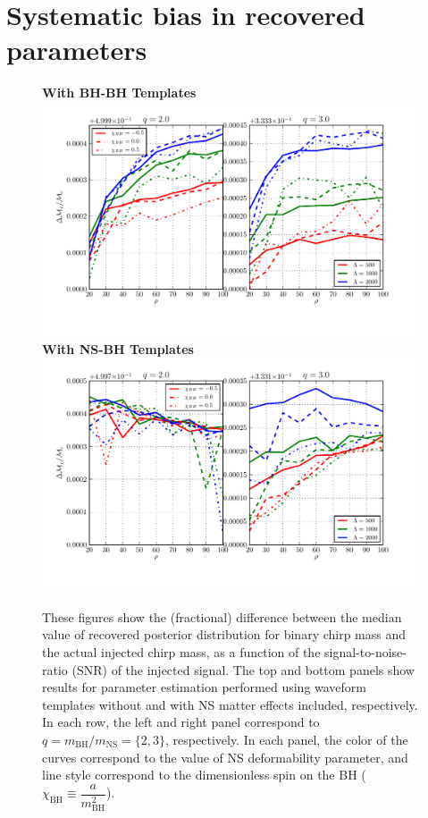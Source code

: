 \documentclass[aps,prd,amsmath,floats,floatfix, twocolumn,
superscriptaddress,nofootinbib,showpacs]{revtex4-1}
\begin{document}
\section{Systematic bias in recovered parameters}
\begin{figure}[h]
\centering 
\textbf{With BH-BH Templates}
\includegraphics[width=2\columnwidth]{plots/TN_chirpMassBias_vs_SNR_q23.pdf}\\ 
\textbf{With NS-BH Templates}
\includegraphics[width=2\columnwidth]{plots/TT_chirpMassBias_vs_SNR_q23.pdf}%
\caption{These figures show the (fractional) difference between the median value of
recovered posterior distribution for binary chirp mass and the actual injected chirp mass,
as a function of the signal-to-noise-ratio (SNR) of the injected signal.
The top and bottom panels show results for parameter estimation performed using
waveform templates without and with NS matter effects included, respectively.
In each row, the left and right panel correspond to 
$q=m_\mathrm{BH}/m_\mathrm{NS}=\{2,3\}$, respectively. 
In each panel, the color of the curves correspond to the value of NS deformability 
parameter, and line style correspond to the dimensionless spin on the BH 
($\chi_\mathrm{BH}\equiv \dfrac{a}{m_\mathrm{BH}^2}$).
}
\label{fig:TNT_chirpMassBias_vs_SNR_q23}
\end{figure}
\end{document}
